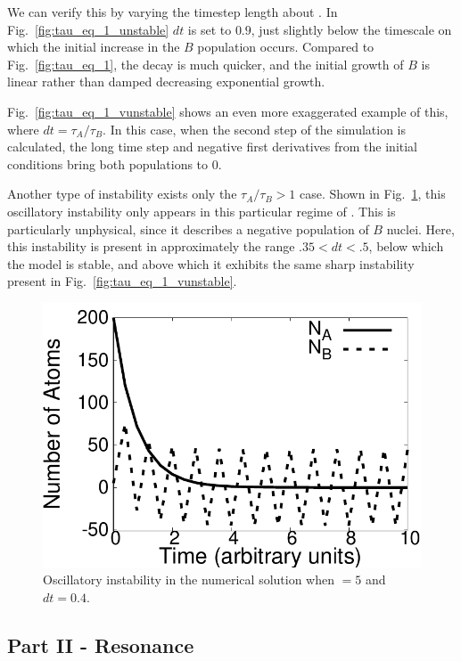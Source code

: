 \documentclass[pra,twocolumn,showpacs,amsmath,amssymb]{revtex4-1}
\begin{document}
We can verify this by varying the timestep length about \trel. In Fig.~\ref{fig:tau_eq_1_unstable}
$dt$ is set to $0.9$, just slightly below the timescale on which the initial increase
in the $B$ population occurs. Compared to Fig.~\ref{fig:tau_eq_1}, the decay
is much quicker, and the initial growth of $B$ is linear rather than damped
decreasing exponential growth.

Fig.~\ref{fig:tau_eq_1_vunstable} shows an even more exaggerated example of this,
where $dt = \tau_A / \tau_B$. In this case, when the second step of the simulation
is calculated, the long time step and negative first derivatives from the initial
conditions bring both populations to 0.

Another type of instability exists only the $\tau_A / \tau_B > 1$ case.
Shown in Fig.~\ref{fig:tgt1_unstable}, this oscillatory instability only appears
in this particular regime of \trel. This is particularly unphysical, since it
describes a negative population of $B$ nuclei. Here, this instability is present
in approximately the range $.35 < dt < .5$, below which the model is stable,
and above which it exhibits the same sharp instability present in Fig.~\ref{fig:tau_eq_1_vunstable}.

\begin{figure}
  \includegraphics[width=.8\linewidth]{tgt1_osc.pdf}
  \caption{Oscillatory instability in the numerical solution when \trel$=5$
  and $dt=0.4$.}
  \label{fig:tgt1_unstable}
\end{figure}



\subsection{Part II - Resonance}\label{sec:resonance}
\end{document}
